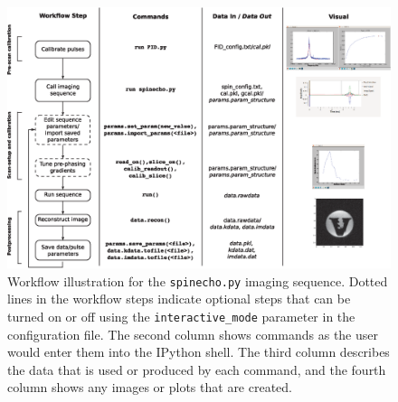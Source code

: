 \documentclass[review]{elsarticle}
\begin{document}
\begin{figure}[!ht]
\begin{center}
\includegraphics[width = \textwidth,trim=0 0 0 0,clip=false]{Fig8_fromChris/Fig8.eps}%
\caption{Workflow illustration for the \texttt{spinecho.py} imaging sequence.  
Dotted lines in the workflow steps indicate optional steps that can be turned on or off using the \texttt{interactive\_mode} parameter in the configuration file.  
The second column shows commands 
as the user would enter them into the IPython shell.  
The third column describes the data that is used or produced by each command, 
and the fourth column shows any images or plots that are created.}
\label{fig:workflow}
\end{center}
\end{figure}
\end{document}

